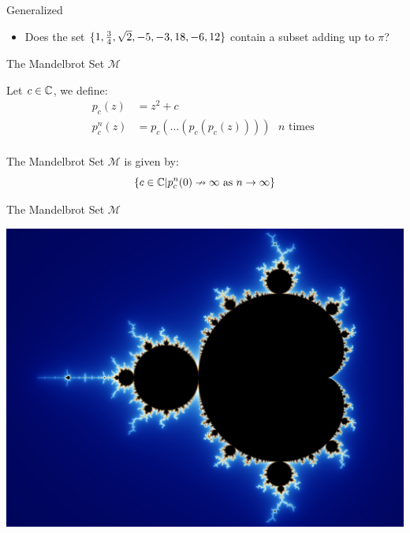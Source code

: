 \documentclass[c]{beamer}
\begin{document}

\begin{frame}{\subsum{} Generalized}
  
  \begin{itemize}
  \item[] Does the set $\{1,\frac{3}{4},\sqrt{2},-5,-3,18,-6,12\}$
    contain a subset adding up to $\pi$?
  \end{itemize}
\end{frame}

\begin{frame}{The Mandelbrot Set $\mathcal{M}$}
  
  Let $c \in \mathbb{C}$, we define:
    \begin{align*}
      p_c(z) &= z^2 + c\\
      p_c^n(z) &= p_c(\ldots(p_c(p_c(z)))) \text{ $n$ times }\\
    \end{align*}
    
    \vspace{-\baselineskip}
    
    The Mandelbrot Set $\mathcal{M}$ is given by:
    $$\{c \in \mathbb{C} |p_c^n(0) \nrightarrow \infty \text{ as } n \rightarrow \infty\}$$
    
\end{frame}

\begin{frame}{The Mandelbrot Set $\mathcal{M}$}

  \includegraphics[width=\textwidth]{media/mandelbrot.jpg}
  
\end{frame}
\end{document}
